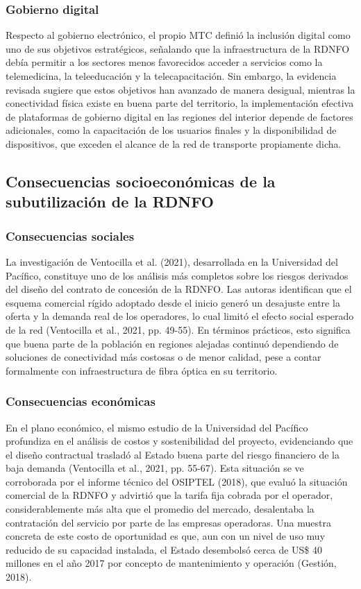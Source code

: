 \subsubsection{Gobierno digital}
Respecto al gobierno electrónico, el propio MTC definió la inclusión digital como uno de sus objetivos estratégicos, señalando que la infraestructura de la RDNFO debía permitir a los sectores menos favorecidos acceder a servicios como la telemedicina, la teleeducación y la telecapacitación. Sin embargo, la evidencia revisada sugiere que estos objetivos han avanzado de manera desigual, mientras la conectividad física existe en buena parte del territorio, la implementación efectiva de plataformas de gobierno digital en las regiones del interior depende de factores adicionales, como la capacitación de los usuarios finales y la disponibilidad de dispositivos, que exceden el alcance de la red de transporte propiamente dicha.

\subsection{Consecuencias socioeconómicas de la subutilización de la RDNFO}
\subsubsection{Consecuencias sociales}
La investigación de Ventocilla et al. (2021), desarrollada en la Universidad del Pacífico, constituye uno de los análisis más completos sobre los riesgos derivados del diseño del contrato de concesión de la RDNFO. Las autoras identifican que el esquema comercial rígido adoptado desde el inicio generó un desajuste entre la oferta y la demanda real de los operadores, lo cual limitó el efecto social esperado de la red (Ventocilla et al., 2021, pp. 49-55). En términos prácticos, esto significa que buena parte de la población en regiones alejadas continuó dependiendo de soluciones de conectividad más costosas o de menor calidad, pese a contar formalmente con infraestructura de fibra óptica en su territorio.

\subsubsection{Consecuencias económicas}
En el plano económico, el mismo estudio de la Universidad del Pacífico profundiza en el análisis de costos y sostenibilidad del proyecto, evidenciando que el diseño contractual trasladó al Estado buena parte del riesgo financiero de la baja demanda (Ventocilla et al., 2021, pp. 55-67). Esta situación se ve corroborada por el informe técnico del OSIPTEL (2018), que evaluó la situación comercial de la RDNFO y advirtió que la tarifa fija cobrada por el operador, considerablemente más alta que el promedio del mercado, desalentaba la contratación del servicio por parte de las empresas operadoras. Una muestra concreta de este costo de oportunidad es que, aun con un nivel de uso muy reducido de su capacidad instalada, el Estado desembolsó cerca de US\$ 40 millones en el año 2017 por concepto de mantenimiento y operación (Gestión, 2018).

